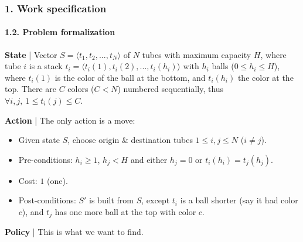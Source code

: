 \documentclass{beamer}
\begin{document}
\begin{frame}
\frametitle{1. Work specification}
\framesubtitle{1.2. Problem formalization}

\textbf{State} | Vector $S = \langle t_1, t_2, ..., t_N \rangle$ of $N$ tubes with maximum capacity $H$, where tube $i$ is a stack $t_i = \langle t_i(1), t_i(2), ..., t_i(h_i) \rangle$ with $h_i$ balls ($0 \leq h_i \leq H$), where $t_i(1)$ is the color of the ball at the bottom, and $t_i(h_i)$ the color at the top. There are $C$ colors ($C < N$) numbered sequentially, thus $\forall i, j,~1 \leq t_i(j) \leq C$.

\textbf{Action} | The only action is a move:
\begin{itemize}
  \item Given state $S$, choose origin \& destination tubes $1 \leq i, j \leq N$ ($i \neq j$).
  \item Pre-conditions: $h_i \geq 1$, $h_j < H$ and either $h_j = 0$ or $t_i(h_i)=t_j(h_j)$.
  \item Cost: $1$ (one).
  \item Post-conditions: $S'$ is built from $S$, except $t_i$ is a ball shorter (say it had color $c$), and $t_j$ has one more ball at the top with color $c$.
\end{itemize}

\textbf{Policy} | This is what we want to find.

\end{frame}
\end{document}
